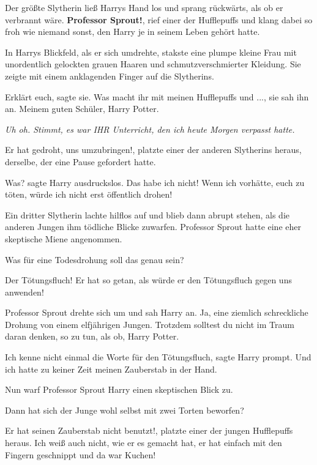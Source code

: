 Der größte Slytherin ließ Harrys Hand los und sprang rückwärts, als ob er
verbrannt wäre. \glqq{}\textbf{Professor Sprout!\grqq{}}, rief einer der
Hufflepuffs und klang dabei so froh wie niemand sonst, den Harry je in seinem
Leben gehört hatte.

In Harrys Blickfeld, als er sich umdrehte, stakste eine plumpe kleine Frau mit
unordentlich gelockten grauen Haaren und schmutzverschmierter Kleidung. Sie
zeigte mit einem anklagenden Finger auf die Slytherins.

\glqq{}Erklärt euch\grqq{}, sagte sie. \glqq{}Was macht ihr mit meinen Hufflepuffs
und ...\grqq{}, sie sah ihn an. \glqq{}Meinem guten Schüler, Harry Potter.\grqq{}

\emph{Uh oh. Stimmt, es war IHR Unterricht, den ich heute Morgen verpasst hatte.
}

\glqq{}Er hat gedroht, uns umzubringen!\grqq{}, platzte einer der anderen
Slytherins heraus, derselbe, der eine Pause gefordert hatte.

\glqq{}Was?\grqq{} sagte Harry ausdruckslos. \glqq{}Das habe ich nicht! Wenn ich
vorhätte, euch zu töten, würde ich nicht erst öffentlich drohen!\grqq{}

Ein dritter Slytherin lachte hilflos auf und blieb dann abrupt stehen, als die
anderen Jungen ihm tödliche Blicke zuwarfen. Professor Sprout hatte eine eher
skeptische Miene angenommen.

\glqq{}Was für eine Todesdrohung soll das genau sein?\grqq{}

\glqq{}Der Tötungsfluch! Er hat so getan, als würde er den Tötungsfluch gegen uns
anwenden!\grqq{}

Professor Sprout drehte sich um und sah Harry an. \glqq{}Ja, eine ziemlich
schreckliche Drohung von einem elfjährigen Jungen. Trotzdem solltest du nicht im
Traum daran denken, so zu tun, als ob, Harry Potter.\grqq{}

\glqq{}Ich kenne nicht einmal die Worte für den Tötungsfluch\grqq{}, sagte Harry
prompt. \glqq{}Und ich hatte zu keiner Zeit meinen Zauberstab in der Hand.\grqq{}

Nun warf Professor Sprout Harry einen skeptischen Blick zu.

\glqq{}Dann hat sich der Junge wohl selbst mit zwei Torten beworfen?\grqq{}

\glqq{}Er hat seinen Zauberstab nicht benutzt!\grqq{}, platzte einer der jungen
Hufflepuffs heraus. \glqq{}Ich weiß auch nicht, wie er es gemacht hat, er hat
einfach mit den Fingern geschnippt und da war Kuchen!\grqq{}

